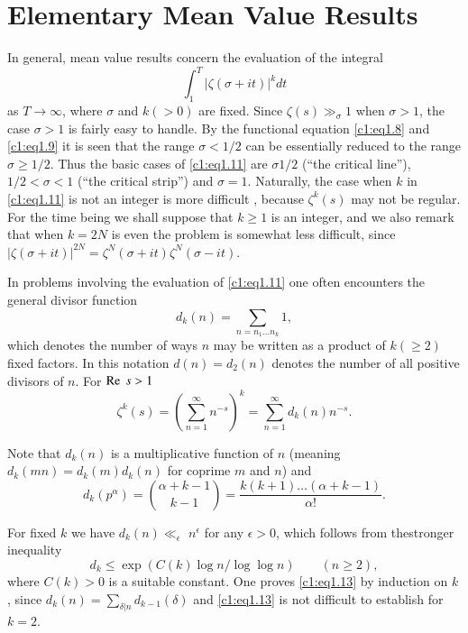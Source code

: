 \section{Elementary Mean Value Results}\label{c1:s2}

In general, mean value results concern the evaluation of the integral 
\begin{equation}
  \int^T_1 \big|\zeta (\sigma + it ) \big|^kdt \label{c1:eq1.11}
\end{equation}
as $T \to \infty$, where $\sigma$ and $k(> 0)$ are fixed. Since
$\zeta(s) \gg_\sigma 1$ when $\sigma > 1$, the case $\sigma > 1$ is
fairly easy to handle. By the functional equation \eqref{c1:eq1.8} and
\eqref{c1:eq1.9} it is seen that the range $\sigma < 1/2$ can be
essentially reduced to the range $\sigma \geq 1/2$. Thus the basic
cases of \eqref{c1:eq1.11} are $\sigma 1/2$ (``the critical line''),
$1/2< \sigma < 1$ (``the critical strip'') and $\sigma=1$. Naturally,
the case when $k$ in \eqref{c1:eq1.11} is not an integer is more
difficult , because $\zeta^k(s)$ may not be regular. For the time
being we shall suppose that $k \geq 1$ is an integer, and we also
remark that when $k=2N$ is even the problem is somewhat less
difficult, since $|\zeta (\sigma + it )|^{2N}= \zeta^N (\sigma+
it ) \zeta^N (\sigma - it )$.

In problems involving the evaluation of \eqref{c1:eq1.11} one often
encounters the general divisor function
$$
d_k (n) = \sum_{n= n_1 \ldots n_k} 1,
$$
which denotes the number of ways $n$ may be written as a product of
$k (\geq 2)$ fixed factors. In this notation $d(n) = d_2 (n)$ denotes
the number of all positive divisors of $n$. For $\operatorname{Re} \; s > 1$
\begin{equation}
  \zeta^k (s) = \left(\sum^\infty_{n=1} n^{-s} \right)^k =
  \sum^\infty_{n=1} d_k (n) n^{-s}.\label{c1:eq1.12}
\end{equation}

Note that $d_k (n)$ is a multiplicative function of $n$ (meaning $d_k
(mn)= d_k (m) d_k (n)$ for coprime $m$ and $n$) and 
$$
d_k (p^\alpha)= \binom{\alpha + k-1}{k-1} = \frac{k(k+1)\ldots (\alpha
  + k-1)}{\alpha !}.
$$

For fixed $k$ we have $d_k (n) \ll_\epsilon$ $n^\epsilon$ for any
$\epsilon > 0$, which follows from the\pageoriginale stronger
inequality
\begin{equation}
d_k \leq  \exp (C(k) \log n/ \log \log n) \qquad (n \geq
2),\label{c1:eq1.13} 
\end{equation}
where $C(k)> 0$ is a suitable constant. One proves \eqref{c1:eq1.13}
by induction on $k$, since $d_k (n)= \sum\limits_{\delta|n} d_{k-1} (\delta)$
and \eqref{c1:eq1.13} is not difficult to establish for $k=2$. 


